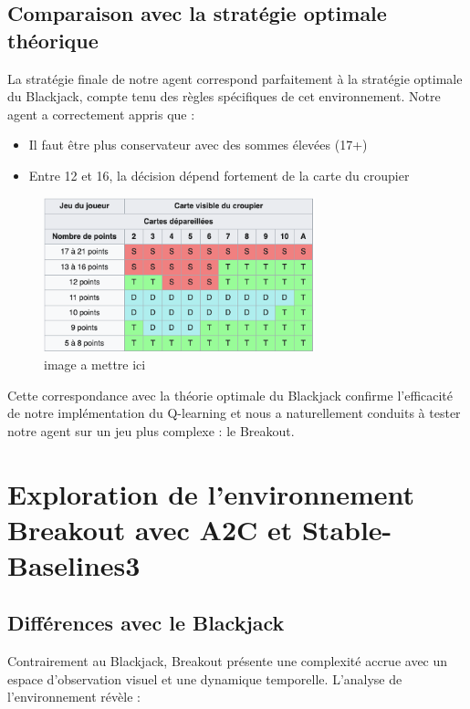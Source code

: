 \documentclass{article}
\begin{document}
\subsection{Comparaison avec la stratégie optimale théorique}

\quad La stratégie finale de notre agent correspond parfaitement à la stratégie optimale du Blackjack, compte tenu des règles spécifiques de cet environnement. Notre agent a correctement appris que :
\begin{itemize} 
    \item Il faut être plus conservateur avec des sommes élevées (17+)
    \item Entre 12 et 16, la décision dépend fortement de la carte du croupier
\end{itemize}

\begin{figure}[ht]
    \centering
    \includegraphics[width=0.7\textwidth]{4.png}
    \caption{image a mettre ici}
\end{figure}

Cette correspondance avec la théorie optimale du Blackjack confirme l’efficacité de notre implémentation du Q-learning et nous a naturellement conduits à tester notre agent sur un jeu plus complexe : le Breakout.

\clearpage

\section{Exploration de l'environnement Breakout avec A2C et Stable-Baselines3}

\subsection{Différences avec le Blackjack}

\quad Contrairement au Blackjack, Breakout présente une complexité accrue avec un espace d'observation visuel et une dynamique temporelle. L'analyse de l'environnement révèle :
\end{document}
